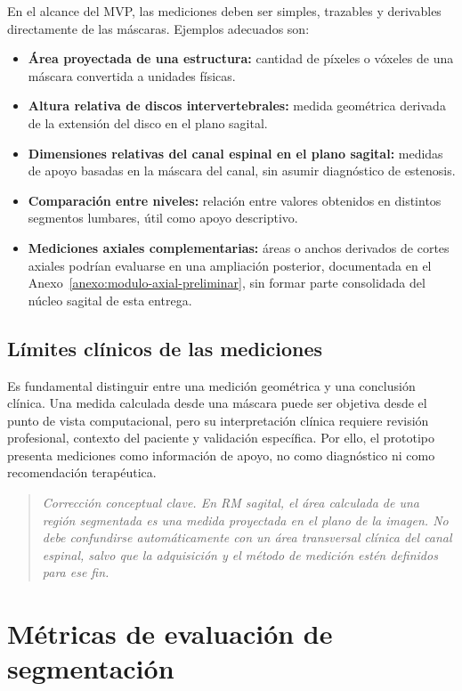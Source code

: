 En el alcance del MVP, las mediciones deben ser simples, trazables y derivables directamente de las máscaras. Ejemplos adecuados son:

\begin{itemize}
    \item \textbf{Área proyectada de una estructura:} cantidad de píxeles o vóxeles de una máscara convertida a unidades físicas.
    \item \textbf{Altura relativa de discos intervertebrales:} medida geométrica derivada de la extensión del disco en el plano sagital.
    \item \textbf{Dimensiones relativas del canal espinal en el plano sagital:} medidas de apoyo basadas en la máscara del canal, sin asumir diagnóstico de estenosis.
    \item \textbf{Comparación entre niveles:} relación entre valores obtenidos en distintos segmentos lumbares, útil como apoyo descriptivo.
    \item \textbf{Mediciones axiales complementarias:} áreas o anchos derivados de cortes axiales podrían evaluarse en una ampliación posterior, documentada en el Anexo~\ref{anexo:modulo-axial-preliminar}, sin formar parte consolidada del núcleo sagital de esta entrega.
\end{itemize}

\subsection{Límites clínicos de las mediciones}

Es fundamental distinguir entre una medición geométrica y una conclusión clínica. Una medida calculada desde una máscara puede ser objetiva desde el punto de vista computacional, pero su interpretación clínica requiere revisión profesional, contexto del paciente y validación específica. Por ello, el prototipo presenta mediciones como información de apoyo, no como diagnóstico ni como recomendación terapéutica.

\begin{quote}
\itshape
Corrección conceptual clave. En RM sagital, el área calculada de una región segmentada es una medida proyectada en el plano de la imagen. No debe confundirse automáticamente con un área transversal clínica del canal espinal, salvo que la adquisición y el método de medición estén definidos para ese fin.
\end{quote}

\section{Métricas de evaluación de segmentación}

